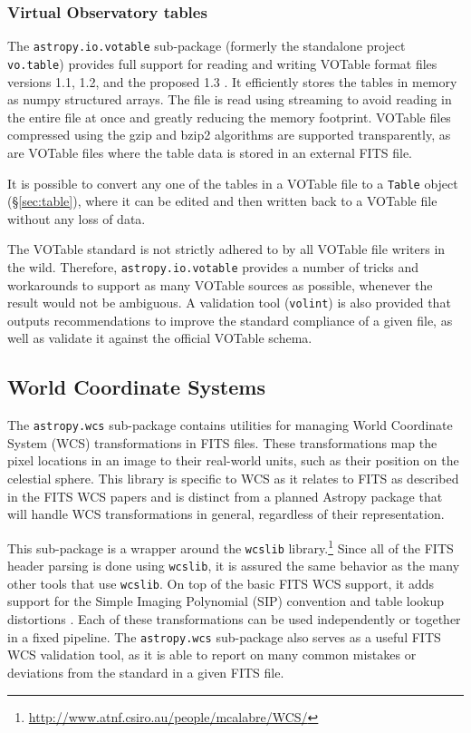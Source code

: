 \documentclass[traditabstract]{aa}
\begin{document}
\subsubsection{Virtual Observatory tables}

\label{sec:votable}

The \texttt{astropy.io.votable} sub-package (formerly the standalone
project \texttt{vo.table}) provides full support for reading and
writing VOTable format files versions 1.1, 1.2, and the proposed 1.3
\citep{ochsenbein2004votable,ochsenbein2009votable}. It efficiently
stores the tables in memory as \gls{numpy} structured arrays. The file
is read using streaming to avoid reading in the entire file at once
and greatly reducing the memory footprint. VOTable files compressed
using the gzip and bzip2 algorithms are supported transparently, as are
VOTable files where the table data is stored in an external FITS file.

It is possible to convert any one of the tables in a VOTable file to a
\texttt{Table} object (\S\ref{sec:table}), where it can be edited and then
written back to a VOTable file without any loss of data.

The VOTable standard is not strictly adhered to by all VOTable file writers in
the wild. Therefore, \texttt{astropy.io.votable} provides a number of tricks
and workarounds to support as many VOTable sources as possible, whenever the
result would not be ambiguous. A validation tool (\texttt{volint}) is also
provided that outputs recommendations to improve the standard compliance of a
given file, as well as validate it against the official VOTable schema.

\subsection{World Coordinate Systems}

\label{sec:wcs}

The \texttt{astropy.wcs} sub-package contains utilities for managing World
Coordinate System (WCS) transformations in FITS files. These transformations
map the pixel locations in an image to their real-world units, such as their
position on the celestial sphere. This library is specific to WCS as it relates
to FITS as described in the FITS WCS papers
\citep{greisen2002wcs,calabretta2002wcs,greisen2006wcs} and is distinct from a
planned Astropy package that will handle WCS transformations in general,
regardless of their representation.

This sub-package is a wrapper around the \texttt{wcslib} library.\footnote{\url{http://www.atnf.csiro.au/people/mcalabre/WCS/}} Since all of the FITS header parsing is done
using \texttt{wcslib}, it is assured the same behavior as the many other tools
that use \texttt{wcslib}. On top of the basic FITS WCS support, it adds support
for the Simple Imaging Polynomial (SIP) convention and table lookup distortions
\citep{calabretta_sip,sip}. Each of
these transformations can be used independently or together in a fixed
pipeline. The \texttt{astropy.wcs} sub-package also serves as a useful FITS WCS validation
tool, as it is able to report on many common mistakes or deviations from the
standard in a given FITS file.
\end{document}
